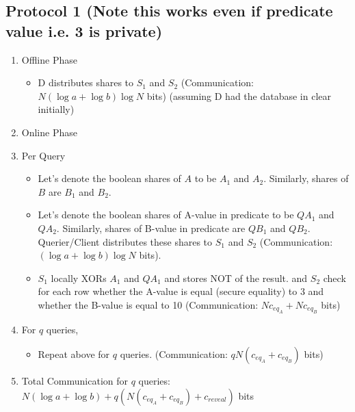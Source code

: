 \subsection{Protocol 1 (Note this works even if predicate value i.e. 3 is private)}
\begin{enumerate}
    \item Offline Phase
    \begin{itemize}
        \item D distributes shares to $S_1$ and $S_2$ (Communication: $N(\log a + \log b)\log N$ bits) (assuming D had the database in clear initially)
    \end{itemize}
    \item Online Phase
    \item Per Query
    \begin{itemize}
        \item Let's denote the boolean shares of $A$ to be $A_1$ and $A_2$. Similarly, shares of $B$ are $B_1$ and $B_2$.
        \item Let's denote the boolean shares of A-value in predicate to be $QA_1$ and $QA_2$. Similarly, shares of B-value in predicate are $QB_1$ and $QB_2$. Querier/Client distributes these shares to $S_1$ and $S_2$ (Communication: $(\log a + \log b)\log N$ bits).
        \item $S_1$ locally XORs $A_1$ and $QA_1$ and stores NOT of the result. and $S_2$ check for each row whether the A-value is equal (secure equality) to 3 and whether the B-value is equal to 10 (Communication: $Nc_{eq_A} + Nc_{eq_B}$ bits)
    \end{itemize}
    \item For $q$ queries,
    \begin{itemize}
        \item Repeat above for $q$ queries. (Communication: $qN(c_{eq_A} + c_{eq_B})$ bits)
    \end{itemize}
    \item Total Communication for $q$ queries: $N(\log a + \log b) + q(N(c_{eq_A} + c_{eq_B}) + c_{reveal})$ bits
\end{enumerate}



%
